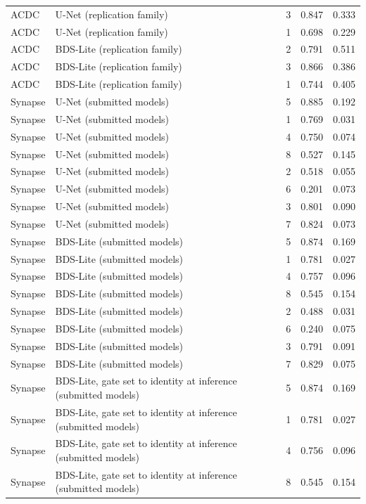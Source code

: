 \begin{tabular}{lllll}
ACDC & U-Net (replication family) & 3 & 0.847 & 0.333 \\
ACDC & U-Net (replication family) & 1 & 0.698 & 0.229 \\
ACDC & BDS-Lite (replication family) & 2 & 0.791 & 0.511 \\
ACDC & BDS-Lite (replication family) & 3 & 0.866 & 0.386 \\
ACDC & BDS-Lite (replication family) & 1 & 0.744 & 0.405 \\
Synapse & U-Net (submitted models) & 5 & 0.885 & 0.192 \\
Synapse & U-Net (submitted models) & 1 & 0.769 & 0.031 \\
Synapse & U-Net (submitted models) & 4 & 0.750 & 0.074 \\
Synapse & U-Net (submitted models) & 8 & 0.527 & 0.145 \\
Synapse & U-Net (submitted models) & 2 & 0.518 & 0.055 \\
Synapse & U-Net (submitted models) & 6 & 0.201 & 0.073 \\
Synapse & U-Net (submitted models) & 3 & 0.801 & 0.090 \\
Synapse & U-Net (submitted models) & 7 & 0.824 & 0.073 \\
Synapse & BDS-Lite (submitted models) & 5 & 0.874 & 0.169 \\
Synapse & BDS-Lite (submitted models) & 1 & 0.781 & 0.027 \\
Synapse & BDS-Lite (submitted models) & 4 & 0.757 & 0.096 \\
Synapse & BDS-Lite (submitted models) & 8 & 0.545 & 0.154 \\
Synapse & BDS-Lite (submitted models) & 2 & 0.488 & 0.031 \\
Synapse & BDS-Lite (submitted models) & 6 & 0.240 & 0.075 \\
Synapse & BDS-Lite (submitted models) & 3 & 0.791 & 0.091 \\
Synapse & BDS-Lite (submitted models) & 7 & 0.829 & 0.075 \\
Synapse & BDS-Lite, gate set to identity at inference (submitted models) & 5 & 0.874 & 0.169 \\
Synapse & BDS-Lite, gate set to identity at inference (submitted models) & 1 & 0.781 & 0.027 \\
Synapse & BDS-Lite, gate set to identity at inference (submitted models) & 4 & 0.756 & 0.096 \\
Synapse & BDS-Lite, gate set to identity at inference (submitted models) & 8 & 0.545 & 0.154 \\

\end{tabular}
